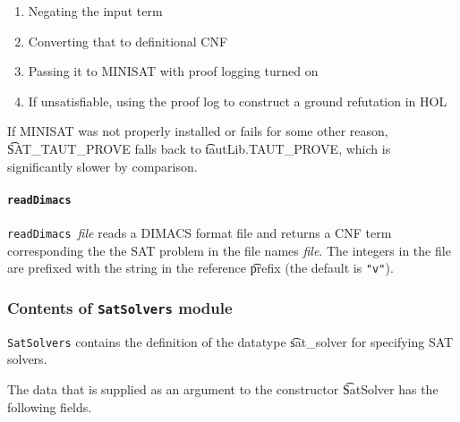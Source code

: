 \begin{enumerate}
\item Negating the input term
\item Converting that to definitional CNF
\item Passing it to MINISAT with proof logging turned on
\item If unsatisfiable, using the proof log to construct a ground refutation in HOL
\end{enumerate}

If MINISAT was not properly installed or fails for some other reason, \t{SAT\_TAUT\_PROVE} 
falls back to \t{tautLib.TAUT\_PROVE}, which is significantly slower by comparison. 

\paragraph{\tt readDimacs}${}$\\

{\small{\tt readDimacs}~{\it file}} reads a DIMACS format file and returns
a CNF \HOL{} term corresponding the the SAT problem in the file names {\it file}.
The integers in the file are prefixed with the string in the reference 
\t{prefix} (the default is {\small\verb+"v"+}).


\subsubsection{Contents of {\tt SatSolvers} module}
{\tt SatSolvers} contains the definition of the datatype \t{sat\_solver} for specifying SAT solvers.


The data that is supplied as an argument to the constructor \t{SatSolver}
has the following fields.

\medskip

